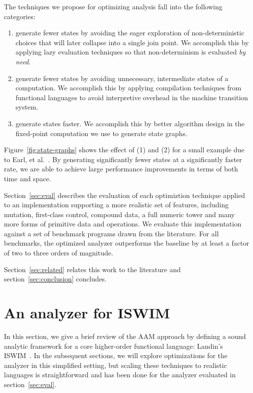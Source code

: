 \documentclass[preprint,onecolumn,9pt]{sigplanconf} %
\begin{document}
The techniques we propose for optimizing analysis fall into the
following categories:
\begin{enumerate}
\item generate fewer states by avoiding the eager exploration of
  non-deterministic choices that will later collapse into a single
  join point.  We accomplish this by applying lazy evaluation
  techniques so that non-determinism is evaluated \emph{by need}.

\item generate fewer states by avoiding unnecessary, intermediate
  states of a computation.  We accomplish this by applying compilation
  techniques from functional languages to avoid interpretive overhead
  in the machine transition system.

\item generate states faster.  We accomplish this by better algorithm
  design in the fixed-point computation we use to generate state graphs.
\end{enumerate}
Figure~\ref{fig:state-graphs} shows the effect of (1) and (2) for a
small example due to Earl, et
al.~\cite{dvanhorn:Earl2012Introspective}.
By generating significantly fewer states at a significantly faster
rate, we are able to achieve large performance improvements in terms
of both time and space.

Section~\ref{sec:eval} describes the evaluation of each optimiztion
technique applied to an implementation supporting a more realistic set
of features, including mutation, first-class control, compound data, a
full numeric tower and many more forms of primitive data and
operations.
%
We evaluate this implementation against a set of benchmark programs
drawn from the literature.
%
For all benchmarks, the optimized analyzer outperforms the baseline
by at least a factor of
two to
three orders of magnitude.

Section~\ref{sec:related} relates this work to the literature and
section~\ref{sec:conclusion} concludes.

\section{An analyzer for ISWIM}
\label{sec:aam}

In this section, we give a brief review of the AAM approach by
defining a sound analytic framework for a core higher-order functional
language: Landin's ISWIM~\cite{dvanhorn:Landin1966Next}.  In the
subsequent sections, we will explore optimizations for the analyzer in
this simplified setting, but scaling these techniques to realistic
languages is straightforward and has been done for the analyzer
evaluated in section~\ref{sec:eval}.
\end{document}
